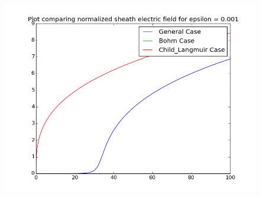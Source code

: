 \documentclass[11pt, a4paper]{article}
\begin{document}
\begin{figure}[H]
 \centering
 \includegraphics[width = \textwidth]{q3Eeps3.png}
\end{figure}
\end{document}

